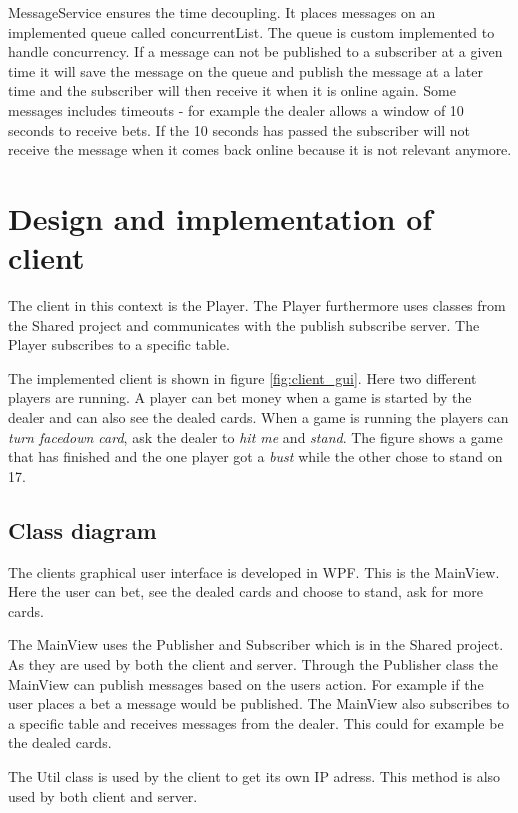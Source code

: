 MessageService ensures the time decoupling. It places messages on an implemented queue called concurrentList. The queue is custom implemented to handle concurrency. If a message can not be published to a subscriber at a given time it will save the message on the queue and publish the message at a later time and the subscriber will then receive it when it is online again. Some messages includes timeouts - for example the dealer allows a window of 10 seconds to receive bets. If the 10 seconds has passed the subscriber will not receive the message when it comes back online because it is not relevant anymore.
\FloatBarrier

\section{Design and implementation of client}
The client in this context is the Player. The Player furthermore uses classes from the Shared project and communicates with the publish subscribe server. The Player subscribes to a specific table.


The implemented client is shown in figure \ref{fig:client_gui}. Here two different players are running. A player can bet money when a game is started by the dealer and can also see the dealed cards. When a game is running the players can \emph{turn facedown card}, ask the dealer to \emph{hit me} and \emph{stand}. The figure shows a game that has finished and the one player got a \emph{bust} while the other chose to stand on 17.
\FloatBarrier


\subsection{Class diagram}
The clients graphical user interface is developed in WPF. This is the MainView. Here the user can bet, see the dealed cards and choose to stand, ask for more cards. 

The MainView uses the Publisher and Subscriber which is in the Shared project. As they are used by both the client and server. Through the Publisher class the MainView can publish messages based on the users action. For example if the user places a bet a message would be published. The MainView also subscribes to a specific table and receives messages from the dealer. This could for example be the dealed cards.

The Util class is used by the client to get its own IP adress. This method is also used by both client and server.

